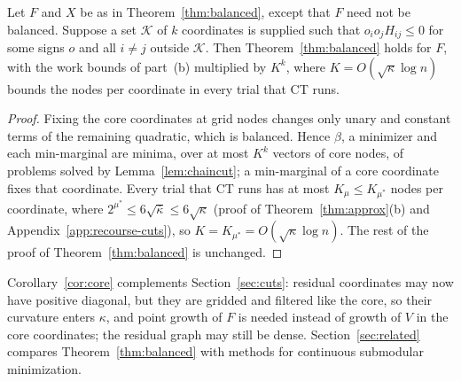 \begin{corollary}\label{cor:core}
Let $F$ and $X$ be as in Theorem~\ref{thm:balanced}, except that $F$ need not
be balanced. Suppose a set $\mathcal K$ of $k$ coordinates is supplied such
that $o_io_jH_{ij}\le0$ for some signs $o$ and all $i\ne j$ outside
$\mathcal K$. Then Theorem~\ref{thm:balanced} holds for $F$, with the work
bounds of part~(b) multiplied by $K^k$, where $K=O(\sqrt\kappa\log n)$
bounds the nodes per coordinate in every trial that CT runs.
\end{corollary}

\begin{proof}
Fixing the core coordinates at grid nodes changes only unary and constant
terms of the remaining quadratic, which is balanced. Hence $\beta$, a
minimizer and each min-marginal are minima, over at most $K^k$ vectors of
core nodes, of problems solved by Lemma~\ref{lem:chaincut}; a min-marginal
of a core coordinate fixes that coordinate. Every trial that CT runs has at most
$K_\mu\le K_{\mu^*}$ nodes per coordinate, where
$2^{\mu^*}\le6\sqrt{\bar\kappa}\le6\sqrt\kappa$ (proof of
Theorem~\ref{thm:approx}(b) and Appendix~\ref{app:recourse-cuts}), so
$K=K_{\mu^*}=O(\sqrt\kappa\log n)$.
The rest of the proof of Theorem~\ref{thm:balanced} is unchanged.
\end{proof}

Corollary~\ref{cor:core} complements Section~\ref{sec:cuts}: residual
coordinates may now have positive diagonal, but they are gridded and filtered
like the core, so their curvature enters $\kappa$, and point growth of $F$
is needed instead of growth of $V$ in the core coordinates; the residual
graph may still be dense.
Section~\ref{sec:related} compares Theorem~\ref{thm:balanced} with methods
for continuous submodular minimization.
